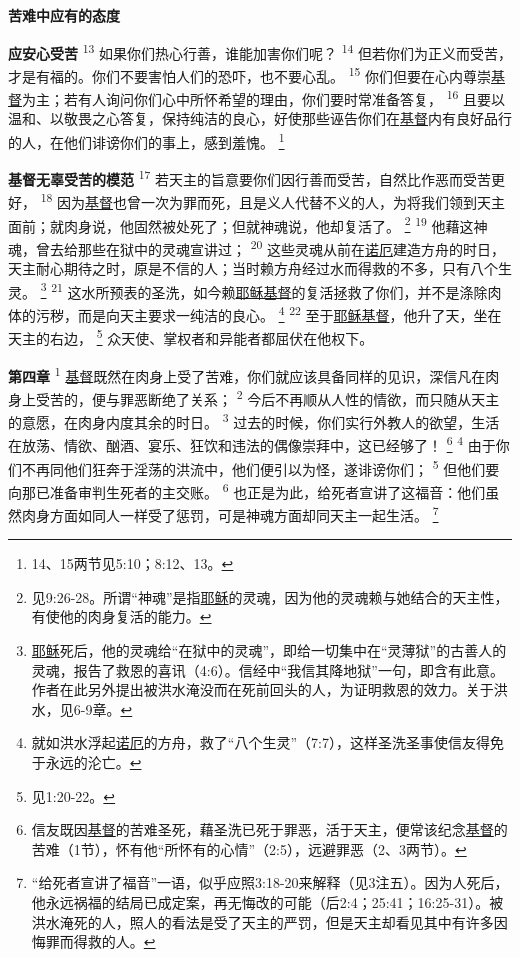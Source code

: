 \begin{center}
	\textbf{\large{\songti 苦难中应有的态度}}
\end{center}

\textbf{应安心受苦\quad}
\textsuperscript{13}
如果你们热心行善，谁能加害你们呢？
\textsuperscript{14}
但若你们为正义而受苦，才是有福的。你们不要害怕人们的恐吓，也不要心乱。
\textsuperscript{15}
你们但要在心内尊崇\uline{基督}为主；若有人询问你们心中所怀希望的理由，你们要时常准备答复，
\textsuperscript{16}
且要以温和、以敬畏之心答复，保持纯洁的良心，好使那些诬告你们在\uline{基督}内有良好品行的人，在他们诽谤你们的事上，感到羞愧。
\footnote{14、15两节见5:10；8:12、13。}

\textbf{基督无辜受苦的模范\quad}
\textsuperscript{17}
若天主的旨意要你们因行善而受苦，自然比作恶而受苦更好，
\textsuperscript{18}
因为\uline{基督}也曾一次为罪而死，且是义人代替不义的人，为将我们领到天主面前；就肉身说，他固然被处死了；但就神魂说，他却复活了。
\footnote{见9:26-28。所谓“神魂”是指\uline{耶稣}的灵魂，因为他的灵魂赖与她结合的天主性，有使他的肉身复活的能力。}
\textsuperscript{19}
他藉这神魂，曾去给那些在狱中的灵魂宣讲过；
\textsuperscript{20}
这些灵魂从前在\uline{诺厄}建造方舟的时日，天主耐心期待之时，原是不信的人；当时赖方舟经过水而得救的不多，只有八个生灵。
\footnote{\uline{耶稣}死后，他的灵魂给“在狱中的灵魂”，即给一切集中在“灵薄狱”的古善人的灵魂，报告了救恩的喜讯（4:6）。信经中“我信其降地狱”一句，即含有此意。作者在此另外提出被洪水淹没而在死前回头的人，为证明救恩的效力。关于洪水，见6-9章。}
\textsuperscript{21}
这水所预表的圣洗，如今赖\uline{耶稣}\uline{基督}的复活拯救了你们，并不是涤除肉体的污秽，而是向天主要求一纯洁的良心。
\footnote{就如洪水浮起\uline{诺厄}的方舟，救了“八个生灵”（7:7），这样圣洗圣事使信友得免于永远的沦亡。}
\textsuperscript{22}
至于\uline{耶稣}\uline{基督}，他升了天，坐在天主的右边，
\footnote{见1:20-22。}
众天使、掌权者和异能者都屈伏在他权下。

\textbf{第四章\quad}
\textsuperscript{1}
\uline{基督}既然在肉身上受了苦难，你们就应该具备同样的见识，深信凡在肉身上受苦的，便与罪恶断绝了关系；
\textsuperscript{2}
今后不再顺从人性的情欲，而只随从天主的意愿，在肉身内度其余的时日。
\textsuperscript{3}
过去的时候，你们实行外教人的欲望，生活在放荡、情欲、酗酒、宴乐、狂饮和违法的偶像崇拜中，这已经够了！
\footnote{信友既因\uline{基督}的苦难圣死，藉圣洗已死于罪恶，活于天主，便常该纪念\uline{基督}的苦难（1节），怀有他“所怀有的心情”（2:5），远避罪恶（2、3两节）。}
\textsuperscript{4}
由于你们不再同他们狂奔于淫荡的洪流中，他们便引以为怪，遂诽谤你们；
\textsuperscript{5}
但他们要向那已准备审判生死者的主交账。
\textsuperscript{6}
也正是为此，给死者宣讲了这福音：他们虽然肉身方面如同人一样受了惩罚，可是神魂方面却同天主一起生活。
\footnote{“给死者宣讲了福音”一语，似乎应照3:18-20来解释（见3注五）。因为人死后，他永远祸福的结局已成定案，再无悔改的可能（后2:4；25:41；16:25-31）。被洪水淹死的人，照人的看法是受了天主的严罚，但是天主却看见其中有许多因悔罪而得救的人。}

